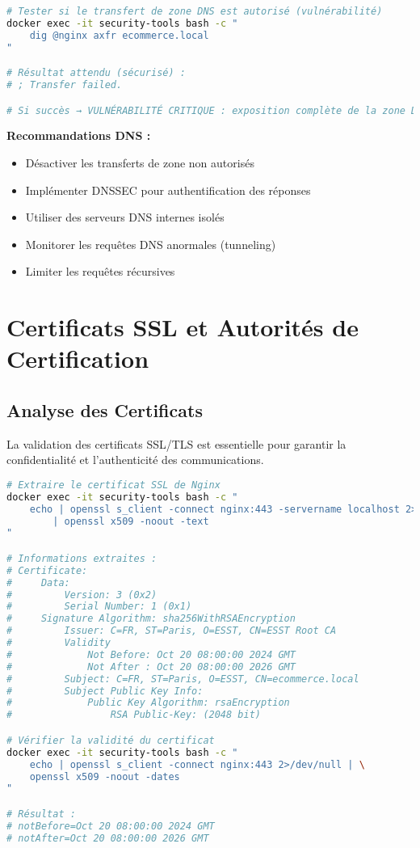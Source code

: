 \documentclass[11pt,a4paper]{report}
\begin{document}
\begin{lstlisting}[language=bash, caption=Test de Transfert de Zone DNS (Vulnérabilité)]
# Tester si le transfert de zone DNS est autorisé (vulnérabilité)
docker exec -it security-tools bash -c "
    dig @nginx axfr ecommerce.local
"

# Résultat attendu (sécurisé) :
# ; Transfer failed.

# Si succès → VULNÉRABILITÉ CRITIQUE : exposition complète de la zone DNS
\end{lstlisting}

\textbf{Recommandations DNS :}
\begin{itemize}
    \item Désactiver les transferts de zone non autorisés
    \item Implémenter DNSSEC pour authentification des réponses
    \item Utiliser des serveurs DNS internes isolés
    \item Monitorer les requêtes DNS anormales (tunneling)
    \item Limiter les requêtes récursives
\end{itemize}

\section{Certificats SSL et Autorités de Certification}

\subsection{Analyse des Certificats}

La validation des certificats SSL/TLS est essentielle pour garantir la confidentialité et l'authenticité des communications.

\begin{lstlisting}[language=bash, caption=Extraction et Analyse du Certificat SSL]
# Extraire le certificat SSL de Nginx
docker exec -it security-tools bash -c "
    echo | openssl s_client -connect nginx:443 -servername localhost 2>/dev/null \
        | openssl x509 -noout -text
"

# Informations extraites :
# Certificate:
#     Data:
#         Version: 3 (0x2)
#         Serial Number: 1 (0x1)
#     Signature Algorithm: sha256WithRSAEncryption
#         Issuer: C=FR, ST=Paris, O=ESST, CN=ESST Root CA
#         Validity
#             Not Before: Oct 20 08:00:00 2024 GMT
#             Not After : Oct 20 08:00:00 2026 GMT
#         Subject: C=FR, ST=Paris, O=ESST, CN=ecommerce.local
#         Subject Public Key Info:
#             Public Key Algorithm: rsaEncryption
#                 RSA Public-Key: (2048 bit)

# Vérifier la validité du certificat
docker exec -it security-tools bash -c "
    echo | openssl s_client -connect nginx:443 2>/dev/null | \
    openssl x509 -noout -dates
"

# Résultat :
# notBefore=Oct 20 08:00:00 2024 GMT
# notAfter=Oct 20 08:00:00 2026 GMT
\end{lstlisting}
\end{document}
